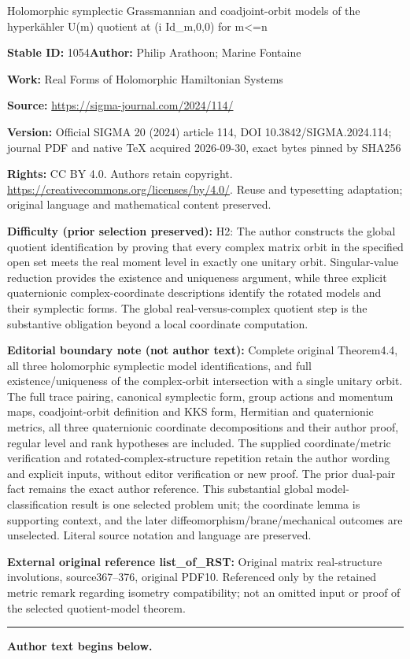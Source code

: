 \documentclass[11pt]{article}
\numberwithin{equation}{section}
\numberwithin{equation}{section}
\begin{document}
\begin{center}\Large Holomorphic symplectic Grassmannian and coadjoint-orbit models of the hyperkähler U(m) quotient at (i Id\_m,0,0) for m<=n\end{center}
\noindent\textbf{Stable ID:} 1054\quad\textbf{Author:} Philip Arathoon; Marine Fontaine\par
\noindent\textbf{Work:} Real Forms of Holomorphic Hamiltonian Systems\par
\noindent\textbf{Source:} \url{https://sigma-journal.com/2024/114/}\par
\noindent\textbf{Version:} Official SIGMA 20 (2024) article 114, DOI 10.3842/SIGMA.2024.114; journal PDF and native TeX acquired 2026-09-30, exact bytes pinned by SHA256\par
\noindent\textbf{Rights:} CC BY 4.0. Authors retain copyright. \url{https://creativecommons.org/licenses/by/4.0/}. Reuse and typesetting adaptation; original language and mathematical content preserved.\par
\noindent\textbf{Difficulty (prior selection preserved):} {\CJKfont H2: The author constructs the global quotient identification by proving that every complex matrix orbit in the specified open set meets the real moment level in exactly one unitary orbit. Singular-value reduction provides the existence and uniqueness argument, while three explicit quaternionic complex-coordinate descriptions identify the rotated models and their symplectic forms. The global real-versus-complex quotient step is the substantive obligation beyond a local coordinate computation.}\par
\medskip\noindent\textbf{Editorial boundary note (not author text):} Complete original Theorem4.4, all three holomorphic symplectic model identifications, and full existence/uniqueness of the complex-orbit intersection with a single unitary orbit. The full trace pairing, canonical symplectic form, group actions and momentum maps, coadjoint-orbit definition and KKS form, Hermitian and quaternionic metrics, all three quaternionic coordinate decompositions and their author proof, regular level and rank hypotheses are included. The supplied coordinate/metric verification and rotated-complex-structure repetition retain the author wording and explicit inputs, without editor verification or new proof. The prior dual-pair fact remains the exact author reference. This substantial global model-classification result is one selected problem unit; the coordinate lemma is supporting context, and the later diffeomorphism/brane/mechanical outcomes are unselected. Literal source notation and language are preserved.\par
\noindent\textbf{External original reference list\_of\_RST:} Original matrix real-structure involutions, source367–376, original PDF10. Referenced only by the retained metric remark regarding isometry compatibility; not an omitted input or proof of the selected quotient-model theorem.\par
\medskip\hrule\medskip\noindent\textbf{Author text begins below.}\par
\setcounter{section}{3}\setcounter{subsection}{1}\setcounter{equation}{3}\setcounter{Theorem}{3}
\end{document}
